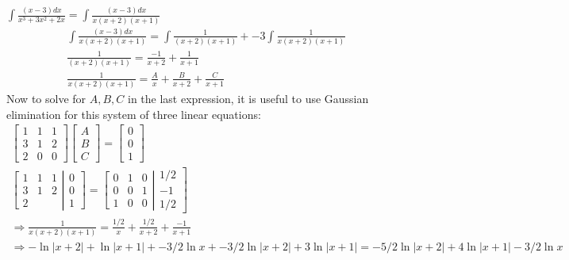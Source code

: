 \documentclass[twoside]{amsart}
\theoremstyle{plain}
\theoremstyle{definition}
\newcommand{\exercisehead}[1]
  {\smallskip
   \noindent{\small\bf Exercise #1.}}
\begin{document}
\exercisehead{16} $\int \frac{ (x-3) dx }{ x^3 + 3x^2 + 2x } = \int \frac{ (x-3)dx }{ x(x+2 )(x+1) }$
\[
\begin{gathered}
  \int \frac{ (x-3) dx}{ x (x+2)(x+1) } = \int \frac{1}{(x+2)(x+1) } + -3 \int \frac{1}{ x (x+2)(x+1) } \\
  \frac{1}{ (x+2)(x+1) } = \frac{ -1}{x+2} + \frac{ 1}{x+1} \\
  \frac{1}{ x(x+2)(x+1) } = \frac{A}{x} + \frac{ B}{x+2} + \frac{C}{x+1}
\end{gathered}
\]
Now to solve for $A,B,C$ in the last expression, it is useful to use Gaussian elimination for this system of three linear equations:
\[
\begin{gathered}
  \left[ \begin{matrix} 1 & 1 & 1 \\ 3 & 1 & 2 \\ 2 & 0 & 0 \end{matrix} \right] \left[ \begin{matrix} A \\ B \\ C \end{matrix} \right] = \left[ \begin{matrix} 0 \\ 0 \\ 1 \end{matrix} \right] \\
  \left[ \begin{matrix} 1 & 1 & 1 \\ 3 & 1 & 2 \\ 2 & & \end{matrix} \right| \left. \begin{matrix} 0 \\ 0 \\ 1 \end{matrix} \right] = \left[ \begin{matrix} 0 & 1 & 0 \\ 0 & 0 & 1 \\ 1 & 0 & 0 \end{matrix} \right| \left. \begin{matrix} 1/2 \\ -1 \\ 1/2 \end{matrix} \right] \\
  \Longrightarrow \frac{1}{ x ( x+2)(x+1) } = \frac{ 1/2}{ x } + \frac{ 1/2}{ x + 2 } + \frac{-1}{  x + 1 } \\
  \Longrightarrow  - \ln{ |x+2| } + \ln{ |x+1| } + -3/2 \ln{x} + -3/2 \ln{ |x+2| } + 3 \ln{ |x+1| }  = \boxed{ -5/2 \ln{ |x+2|} + 4 \ln{ |x+1| } - 3/2 \ln{x} }
\end{gathered}
\]
\end{document}

